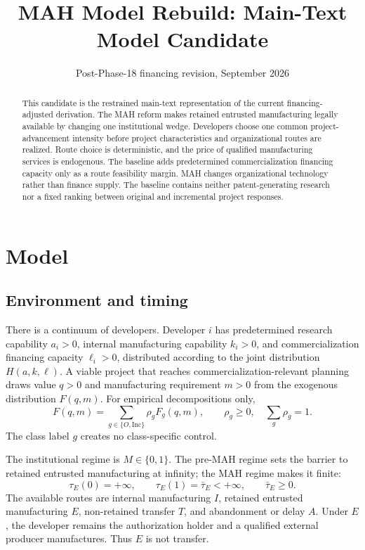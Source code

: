 \documentclass[11pt]{article}
\title{MAH Model Rebuild: Main-Text Model Candidate}
\author{}
\date{Post-Phase-18 financing revision, September 2026}
\begin{document}
\maketitle

\begin{abstract}
This candidate is the restrained main-text representation of the current
financing-adjusted derivation. The MAH reform makes retained entrusted manufacturing
legally available by changing one institutional wedge. Developers choose one
common project-advancement intensity before project characteristics and
organizational routes are realized. Route choice is deterministic, and the
price of qualified manufacturing services is endogenous. The baseline
adds predetermined commercialization financing capacity only as a route
feasibility margin. MAH changes organizational technology rather than finance
supply. The baseline contains neither patent-generating research nor a fixed
ranking between original and incremental project responses.
\end{abstract}

\setcounter{section}{2}
\section{Model}
\label{sec:p16m-model}

\subsection{Environment and timing}
\label{subsec:p16m-environment}

There is a continuum of developers. Developer \(i\) has predetermined
research capability \(a_i>0\), internal manufacturing capability \(k_i>0\),
and commercialization financing capacity \(\ell_i>0\), distributed according
to the joint distribution \(H(a,k,\ell)\). A viable project that reaches
commercialization-relevant planning draws value \(q>0\) and manufacturing
requirement \(m>0\) from the exogenous distribution \(F(q,m)\). For empirical
decompositions only,
\[
  F(q,m)=\sum_{g\in\{O,\mathrm{Inc}\}}\rho_gF_g(q,m),
  \qquad
  \rho_g\geq0,\quad \sum_g\rho_g=1.
\]
The class label \(g\) creates no class-specific control.

The institutional regime is \(M\in\{0,1\}\). The pre-MAH regime sets the
barrier to retained entrusted manufacturing at infinity; the MAH regime
makes it finite:
\begin{equation}
  \tau_E(0)=+\infty,
  \qquad
  \tau_E(1)=\bar\tau_E<+\infty,
  \qquad \bar\tau_E\geq0.
  \label{eq:p16m-policy}
\end{equation}
The available routes are internal manufacturing \(I\), retained entrusted
manufacturing \(E\), non-retained transfer \(T\), and abandonment or delay
\(A\). Under \(E\), the developer remains the authorization holder and a
qualified external producer manufactures. Thus \(E\) is not transfer.
\end{document}
